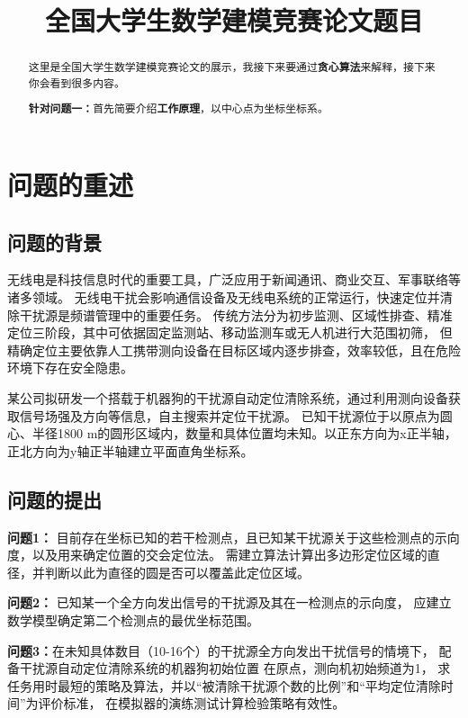 \documentclass[withoutpreface,bwprint]{cumcmthesis} %
\title{全国大学生数学建模竞赛论文题目} %
\begin{document}
\maketitle %

\begin{abstract}
这里是全国大学生数学建模竞赛论文的展示，我接下来要通过\textbf{贪心算法}来解释，接下来你会看到很多内容。

\textbf{针对问题一：}首先简要介绍\textbf{工作原理}，以中心点为坐标坐标系。

\end{abstract}

\tableofcontents %

\section{问题的重述}
\subsection{问题的背景}
无线电是科技信息时代的重要工具，广泛应用于新闻通讯、商业交互、军事联络等诸多领域。
无线电干扰会影响通信设备及无线电系统的正常运行，快速定位并清除干扰源是频谱管理中的重要任务。
传统方法分为初步监测、区域性排查、精准定位三阶段，其中可依据固定监测站、移动监测车或无人机进行大范围初筛，
但精确定位主要依靠人工携带测向设备在目标区域内逐步排查，效率较低，且在危险环境下存在安全隐患。

某公司拟研发一个搭载于机器狗的干扰源自动定位清除系统，通过利用测向设备获取信号场强及方向等信息，自主搜索并定位干扰源。
已知干扰源位于以原点为圆心、半径1800 m的圆形区域内，数量和具体位置均未知。以正东方向为x正半轴，正北方向为y轴正半轴建立平面直角坐标系。
\subsection{问题的提出}
\textbf{问题1：} 目前存在坐标已知的若干检测点，且已知某干扰源关于这些检测点的示向度，以及用来确定位置的交会定位法。
需建立算法计算出多边形定位区域的直径，并判断以此为直径的圆是否可以覆盖此定位区域。

\textbf{问题2：} 已知某一个全方向发出信号的干扰源及其在一检测点的示向度，
应建立数学模型确定第二个检测点的最优坐标范围。

\textbf{问题3：}在未知具体数目（10-16个）的干扰源全方向发出干扰信号的情境下，
配备干扰源自动定位清除系统的机器狗初始位置
在原点，测向机初始频道为1，
求任务用时最短的策略及算法，并以“被清除干扰源个数的比例”和“平均定位清除时间”为评价标准，
在模拟器的演练测试计算检验策略有效性。
\end{document}

